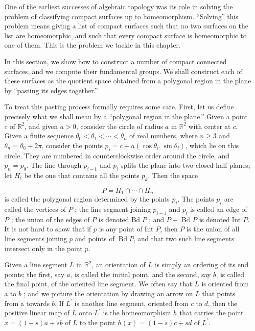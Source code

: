 
One of the earliest successes of algebraic topology was its role in solving the problem of classifying compact surfaces up to homeomorphism. ``Solving'' this problem means giving a list of compact surfaces such that no two surfaces on the list are homeomorphic, and such that every compact surface is homeomorphic to one of them. This is the problem we tackle in this chapter.


In this section, we show how to construct a number of compact connected surfaces, and we compute their fundamental groups. We shall construct each of these surfaces as the quotient space obtained from a polygonal region in the plane by ``pasting its edges together.''

To treat this pasting process formally requires some care. First, let us define precisely what we shall mean by a ``polygonal region in the plane.'' Given a point \(c\) of \(\mathbb{R}^{2}\), and given \(a > 0\), consider the circle of radius \(a\) in \(\mathbb{R}^{2}\) with center at \(c\). Given a finite sequence \({\theta }_{0} < {\theta }_{1} < \cdots < {\theta }_{n}\) of real numbers, where \(n \geq 3\) and \({\theta }_{n} = {\theta }_{0} + {2\pi }\), consider the points \(p_{i} = c + a( {\cos {\theta }_{i},\sin {\theta }_{i}})\), which lie on this circle. They are numbered in counterclockwise order around the circle, and \(p_{n} = p_{0}\). The line through \(p_{i - 1}\) and \(p_{i}\) splits the plane into two closed half-planes; let \(H_{i}\) be the one that contains all the points \(p_{k}\). Then the space

\[
P = H_{1} \cap \cdots \cap {H}_{n}
\]
is called the polygonal region determined by the points \(p_{i}\). The points \(p_{i}\) are called the vertices of \(P\) ; the line segment joining \(p_{i - 1}\) and \(p_{i}\) is called an edge of \(P\) ; the union of the edges of \(P\) is denoted Bd \(P\) ; and \(P -\) Bd \(P\) is denoted Int \(P\). It is not hard to show that if \(p\) is any point of Int \(P\), then \(P\) is the union of all line segments joining \(p\) and points of \(\operatorname{Bd}P\), and that two such line segments intersect only in the point \(p\).

Given a line segment \(L\) in \(\mathbb{R}^{2}\), an orientation of \(L\) is simply an ordering of its end points; the first, say \(a\), is called the initial point, and the second, say \(b\), is called the final point, of the oriented line segment. We often say that \(L\) is oriented from a to \(b\) ; and we picture the orientation by drawing an arrow on \(L\) that points from a towards \(b\). If \(L^{\prime }\) is another line segment, oriented from \(c\) to \(d\), then the positive linear map of \(L\) onto \(L^{\prime }\) is the homeomorphism \(h\) that carries the point \(x = ( {1 - s}) a + {sb}\) of \(L\) to the point \(h(x) = ( {1 - s}) c + {sd}\) of \(L^{\prime }\).

